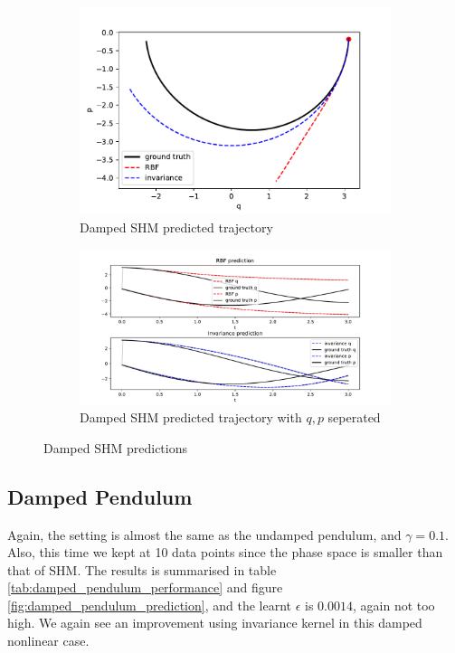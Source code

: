\documentclass{statsmsc}
\begin{document}
\begin{figure}[H]
     \centering
     \begin{subfigure}[b]{\linewidth}
        \centering
        \includegraphics[width=\linewidth]{../codes/figures/damped_shm_predicted_trajectory.pdf}
        \caption{Damped SHM predicted trajectory}
        \label{fig:damped_shm_prediction_combined}
     \end{subfigure}
     \hfill
     \begin{subfigure}[b]{\linewidth}
         \centering
         \includegraphics[width=\linewidth]{../codes/figures/damped_shm_predicted_trajectory_seperate.pdf}
         \caption{Damped SHM predicted trajectory with $q, p$ seperated}
         \label{fig:damped_shm_prediction_seperate}
     \end{subfigure}
        \caption{Damped SHM predictions}
        \label{fig:damped_shm_prediction}
\end{figure}

\subsection{Damped Pendulum}
Again, the setting is almost the same as the undamped pendulum, and $\gamma=0.1$. 
Also, this time we kept at 10 data points since the phase space is smaller than that of SHM. 
The results is summarised in table \ref{tab:damped_pendulum_performance} and figure \ref{fig:damped_pendulum_prediction}, and the learnt $\epsilon$ is $0.0014$, again not too high.
We again see an improvement using invariance kernel in this damped nonlinear case. 
\end{document}
